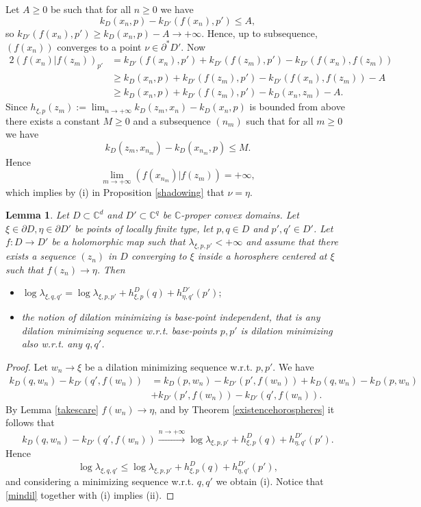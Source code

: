 \documentclass[11pt, reqno]{amsart}
\numberwithin{equation}{section}
\newtheorem{lemma}[theorem]{Lemma}
\theoremstyle{definition}
\newcommand{\C}{\mathbb{C}}
\begin{document}
{{{		
		\proof
		Let $A\geq 0$ be such that for all $n\geq0$ we have $$k_D(x_n,p)-k_{D'}(f(x_n),p')\leq A,$$ so $k_{D'}(f(x_n),p')\geq k_D(x_n,p)-A\to+\infty$. Hence, up to subsequence, $(f(x_n))$ converges to a point $\nu\in \partial^*D'.$
		Now  \begin{align*}
			2(f(x_n)|f(z_m))_{p'}&=k_{D'}(f(x_n),p')+k_{D'}(f(z_m),p')-k_{D'}(f(x_n),f(z_m))
			\\&\geq k_{D}(x_n,p)+k_{D'}(f(z_m),p')-k_{D'}(f(x_n),f(z_m))-A
			\\&\geq k_{D}(x_n,p)+k_{D'}(f(z_m),p')-k_{D}(x_n,z_m)-A.
		\end{align*}
Since $h_{\xi,p}(z_m):=\lim_{n\to+\infty}k_D(z_m,x_n)-k_D(x_n,p)$ is bounded from above there exists a constant $M\geq 0$ and a subsequence $(n_m)$ such that for all $m\geq 0$ we have
$$k_D(z_m,x_{n_m})-k_D(x_{n_m},p)\leq M.$$
Hence $$\lim_{m\to+\infty}(f(x_{n_m})|f(z_m))=+\infty, $$
which implies by (i) in Proposition \ref{shadowing} that $\nu=\eta$.
		\endproof
		
		\begin{lemma}\label{basepointindependent}
			Let $D\subset\C^d$ and $D'\subset\C^{q}$ be  $\C$-proper convex domains. Let $\xi\in\partial D,\eta\in \partial D'$ be points of locally finite type, let $p,q\in D$ and $p',q'\in D'$. Let $f\colon D\to D'$ be a holomorphic map such that $\lambda_{\xi,p,p'}<+\infty$ and assume that there exists a sequence $(z_n)$ in $D$ converging to $\xi$ inside a  horosphere centered at  $\xi$ such that
			$f(z_n)\to \eta$.
			Then
			\begin{itemize}
				\item[(i)] $\log\lambda_{\xi,q,q'}=\log\lambda_{\xi,p,p'}+h^D_{\xi,p}(q)+h^{D'}_{\eta,q'}(p');$
				\item[(ii)] the notion of dilation minimizing is base-point independent, that is any dilation minimizing sequence w.r.t. base-points $p,p'$ is dilation minimizing also w.r.t. any $q,q'$.
			\end{itemize}
		\end{lemma}
		\begin{proof}
			Let $w_n\to \xi$ be a dilation minimizing sequence w.r.t. $p,p'$. We have 
			\begin{align*}k_D(q,w_n)-k_{D'}(q',f(w_n))&=k_D(p,w_n)-k_{D'}(p',f(w_n))+k_D(q,w_n)-k_D(p,w_n)\\
				&+k_{D'}(p',f(w_n))-k_{D'}(q',f(w_n)).
			\end{align*}
			By Lemma \ref{takescare} $f(w_n)\to \eta$, and by Theorem \ref{existencehorospheres}
			it follows that 
			\begin{equation}\label{mindil}
				k_D(q,w_n)-k_{D'}(q',f(w_n))\stackrel{n\to+\infty}\longrightarrow \log\lambda_{\xi,p,p'}+h^{D}_{\xi,p}(q)+h^{D'}_{\eta,q'}(p').
			\end{equation}
			Hence
			$$\log\lambda_{\xi,q,q'}\leq \log\lambda_{\xi,p,p'}+h^{D}_{\xi,p}(q)+h^{D'}_{\eta,q'}(p'),$$
			and considering a minimizing sequence w.r.t. $q,q'$ we obtain (i). Notice that  \eqref{mindil} together with (i) implies  (ii). 
		\end{proof}
		
}}}
\end{document}
